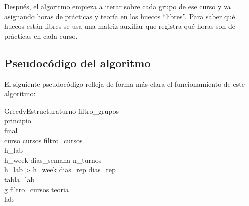 Después, el algoritmo empieza a iterar sobre cada grupo de ese curso y va asignando horas de prácticas y teoría en los huecos ``libres''. Para saber qué huecos están libres se usa una matriz auxiliar que registra qué horas son de prácticas en cada curso.

\subsection{Pseudocódigo del algoritmo}
El siguiente pseudocódigo refleja de forma más clara el funcionamiento de este algoritmo:

\begin{pseudocode}{GreedyEstructura}{turno}
\label{greedyestructura}
filtro\_grupos \GETS {}\\
principio \GETS {}\\
final \GETS {}\\
\FOREACH curso \in cursos \DO
\BEGIN
    filtro\_cursos \GETS {}\\
    h\_lab \GETS {}\\
    h\_week \GETS dias\_semana \cdot n\_turnos\\

    \IF h\_lab > h\_week \THEN
	    	dias\_rep \GETS {}
    \ELSE 
      dias\_rep \GETS \emptyset\\

   	tabla\_lab \GETS {}\\

   	\FOREACH g \in filtro\_cursos \DO
   	\BEGIN
   		teoria \GETS {}\\
   		lab \GETS {}\\


\end{pseudocode}
